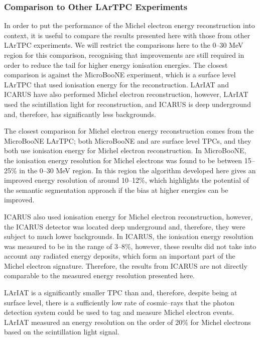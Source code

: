 \subsubsection*{Comparison to Other LArTPC Experiments} \label{ME_COMP}

In order to put the performance of the Michel electron energy
reconstruction into context, it is useful to compare the results presented 
here with those from other LArTPC experiments. We will restrict the 
comparisons here to the 0--30 MeV region for this comparison, recognising that 
improvements are still required in order to reduce the tail for higher energy 
ionisation energies.  The closest comparison is against the MicroBooNE 
experiment, which is a surface level LArTPC that used ionisation energy for 
the reconstruction\cite{Acciarri:2017sjy}. LArIAT and ICARUS have also performed 
Michel electron reconstruction\cite{Amoruso:2003sw,Foreman_2016}, however, 
LArIAT used the scintillation light for reconstruction, and ICARUS is deep 
underground and, therefore, has significantly less backgrounds.

The closest comparison for Michel electron energy reconstruction comes from the
MicroBooNE LArTPC; both MicroBooNE and \protodune{} are surface level TPCs, and
they both use ionisation energy for Michel electron reconstruction. In
MicroBooNE, the ionisation energy resolution for Michel electrons was found to
be between 15--25\% in the 0--30 MeV region\cite{Acciarri:2017sjy}. In this region
the algorithm developed here gives an improved energy resolution of around
10--12\%, which highlights the potential of the semantic segmentation approach 
if the bias at higher energies can be improved.

ICARUS also used ionisation energy for Michel electron reconstruction, however,
the ICARUS detector was located deep underground and, therefore, they were
subject to much lower backgrounds. In ICARUS, the ionisation energy resolution 
was measured to be in the range of 3--8\%\cite{Amoruso:2003sw}, however, these
results did not take into account any radiated energy deposits, which form an
important part of the Michel electron signature. Therefore, the results from
ICARUS are not directly comparable to the measured energy resolution presented
here.

LArIAT is a significantly smaller TPC than \protodune{} and, therefore, despite
being at surface level, there is a sufficiently low rate of cosmic--rays that the
photon detection system could be used to tag and measure Michel electron events.
LArIAT measured an energy resolution on the order of 20\% for Michel electrons 
based on the scintillation light signal\cite{Foreman_2016}. 

